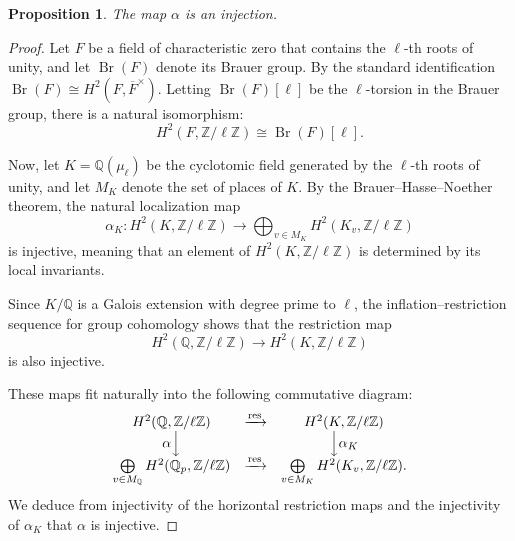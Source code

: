 \documentclass[11pt,reqno]{amsart}
\newtheorem{proposition}[theorem]{Proposition}
\newcommand{\Z}{\mathbb{Z}}
\newcommand{\Q}{\mathbb{Q}}
\newcommand{\op}[1]{\operatorname{#1}}
\numberwithin{equation}{section}
\begin{document}
\begin{proposition}\label{ H2 injection }
    The map $\alpha$ is an injection.
\end{proposition}
\begin{proof}
    Let \( F \) be a field of characteristic zero that contains the \(\ell\)-th roots of unity, and let \(\op{Br}(F)\) denote its Brauer group. By the standard identification \(\op{Br}(F) \cong H^2(F, \overline{F}^\times)\). Letting \(\op{Br}(F)[\ell]\) be the \(\ell\)-torsion in the Brauer group, there is a natural isomorphism:
\[
H^2(F, \Z/\ell\Z) \cong \op{Br}(F)[\ell].
\]  

\noindent Now, let \( K = \Q(\mu_\ell) \) be the cyclotomic field generated by the \(\ell\)-th roots of unity, and let \( M_K \) denote the set of places of \( K \). By the Brauer{--}Hasse{--}Noether theorem, the natural localization map  
\[
\alpha_K: H^2(K, \Z/\ell\Z) \longrightarrow \bigoplus_{v \in M_K} H^2(K_v, \Z/\ell\Z)
\]  
is injective, meaning that an element of \( H^2(K, \Z/\ell\Z) \) is determined by its local invariants.  

Since \( K/\Q \) is a Galois extension with degree prime to \(\ell\), the inflation{--}restriction sequence for group cohomology shows that the restriction map  
\[
H^2(\Q, \Z/\ell\Z) \longrightarrow H^2(K, \Z/\ell\Z)
\]  
is also injective.  

 These maps fit naturally into the following commutative diagram:  
\[
\begin{array}{ccc}
H^2(\Q, \Z/\ell\Z) & \xrightarrow{\operatorname{res}} & H^2(K, \Z/\ell\Z) \\
\alpha \Big\downarrow & & \Big\downarrow \alpha_K \\
\bigoplus\limits_{v \in M_\Q} H^2(\Q_p, \Z/\ell\Z) & \xrightarrow{\operatorname{res}} & \bigoplus\limits_{v \in M_K} H^2(K_v, \Z/\ell\Z).
\end{array}
\]
We deduce from injectivity of the horizontal restriction maps and the injectivity of $\alpha_K$ that $\alpha$ is injective.
\end{proof}
\end{document}
